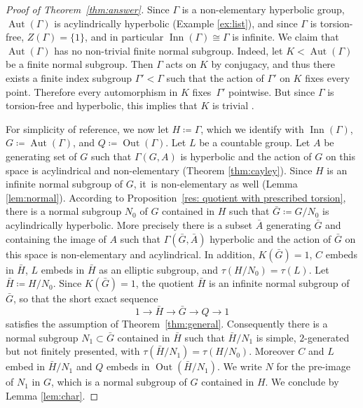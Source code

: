 \documentclass[JEP,XML,SOM,Unicode]{cedram}
\theoremstyle{definition}
\newcommand{\Aut}{\operatorname{Aut}}
\newcommand{\Out}{\operatorname{Out}}
\newcommand{\Inn}{\operatorname{Inn}}
\begin{document}
\begin{proof}[Proof of Theorem~\ref{thm:answer}]
Since $\Gamma$ is a non-elementary hyperbolic group, $\Aut(\Gamma)$ is acylindrically hyperbolic (Example \ref{ex:list}), and since $\Gamma$ is torsion-free, $Z(\Gamma) = \{ 1 \}$, and in particular $\Inn(\Gamma) \cong \Gamma$ is infinite. We claim that $\Aut(\Gamma)$ has no non-trivial finite normal subgroup. Indeed, let $K < \Aut(\Gamma)$ be a finite normal subgroup. Then $\Gamma$ acts on $K$ by conjugacy, and thus there exists a finite index subgroup $\Gamma' < \Gamma$ such that the action of $\Gamma'$ on $K$ fixes every point. Therefore every automorphism in $K$ fixes~$\Gamma'$ pointwise. But since $\Gamma$ is torsion-free and hyperbolic, this implies that $K$ is trivial \cite[Lem.\,2.2 \& 2.3]{root}.

For simplicity of reference, we now let $H \coloneqq \Gamma$, which we identify with $\Inn(\Gamma)$, $G \coloneqq \Aut(\Gamma)$, and $Q \coloneqq \Out(\Gamma)$.
Let $L$ be a countable group.
Let $A$ be generating set of $G$ such that $\Gamma(G,A)$ is hyperbolic and the action of $G$ on this space is acylindrical and non-elementary (Theorem \ref{thm:cayley}).
Since $H$ is an infinite normal subgroup of $G$, it~is non-elementary as well (Lemma \ref{lem:normal}).
According to Proposition~\ref{res: quotient with prescribed torsion}, there is a normal subgroup $N_0$ of $G$ contained in $H$ such that $\bar G \coloneqq G/N_0$ is acylindrically hyperbolic.
More precisely there is a subset $\bar A$ generating $\bar G$ and containing the image of $A$ such that $\Gamma(\bar G, \bar A)$ hyperbolic and the action of $\bar G$ on this space is non-elementary and acylindrical.
In addition, $K(\bar G) = 1$, $C$ embeds in $\bar H$, $L$ embeds in $\bar H$ as an elliptic subgroup, and $\tau(H/N_0) = \tau(L)$.
Let $\bar H \coloneqq H/N_0$.
Since $K(\bar G) = 1$, the quotient $\bar H$ is an infinite normal subgroup of $\bar G$, so that the short exact sequence
\begin{equation*}
1 \to \bar H \to \bar G \to Q \to 1
\end{equation*}
satisfies the assumption of Theorem~\ref{thm:general}.
Consequently there is a normal subgroup $N_1 \subset \bar G$ contained in $\bar H$ such that $\bar H/N_1$ is simple, $2$-generated but not finitely presented, with $\tau(\bar H/N_1) = \tau(H/N_0)$.
Moreover $C$ and $L$ embed in $\bar H/N_1$ and $Q$ embeds in $\Out(\bar H/N_1)$.
We write $N$ for the pre-image of $N_1$ in $G$,
which is a normal subgroup of $G$ contained in $H$.
We conclude by Lemma \ref{lem:char}.
\end{proof}
\end{document}
